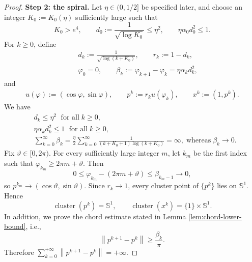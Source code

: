 \documentclass[11pt]{article}
\numberwithin{equation}{section}
\newcommand{\norm}[1]{\left\lVert #1\right\rVert}
\newcommand{\Sone}{\mathbb S^1}
\newcommand{\nn}{\nonumber}
\begin{document}
\begin{proof}
\medskip\noindent
\textbf{Step 2: the spiral.}
Let $\eta\in(0,1/2]$ be specified later, and choose an integer
$K_0:=K_0(\eta)$ sufficiently large such that
\begin{equation}\label{eq:K0-conditions}
K_0>e^4,\qquad
d_0:=\frac{1}{\sqrt{\log K_0}}\leq\eta^2,
\qquad
\eta\alpha_0d_0^2\leq1.
\end{equation}
For $k\geq0$, define
\begin{eqnarray}\label{dkvark}
&&d_k:=\frac1{\sqrt{\log(k+K_0)}},\qquad r_k:=1-d_k,\nn\\
&&\varphi_0=0,\qquad \beta_k:=\varphi_{k+1}-\varphi_k=\eta\alpha_kd_k^2,\end{eqnarray}
and
\begin{eqnarray}\label{uk}
u(\varphi):=(\cos\varphi,\sin\varphi),\qquad p^k:=r_ku(\varphi_k),\qquad x^k:=(1,p^k).
\end{eqnarray}
We have
\begin{align}
 &d_k\le\eta^2\;\mbox{ for all}\; k\ge0,\label{adddk}\\
&\eta\alpha_kd_k^2\le 1\;\mbox{ for all}\; k\ge 0,\nn\\
 &\sum_{k=0}^\infty\beta_k=\frac\eta2\sum_{k=0}^\infty\frac1{(k+K_0+1)\log(k+K_0)}=\infty,
\;
\mbox{whereas}\; \beta_k\to0.
\end{align}
 Fix \(\vartheta\in[0,2\pi)\).  For every sufficiently large integer \(m\),
let \(k_m\) be the first index such that
\(\varphi_{k_m}\geq2\pi m+\vartheta\).  Then
\[
    0\leq\varphi_{k_m}-(2\pi m+\vartheta)
    \leq\beta_{k_m-1}\longrightarrow0,
\]
so \(p^{k_m}\to(\cos\vartheta,\sin\vartheta)\).  Since \(r_k\to1\), every
cluster point of \(\{p^k\}\) lies on \(\Sone\).  Hence
\[
    \operatorname{cluster}(p^k)=\Sone,
    \qquad
    \operatorname{cluster}(x^k)=\{1\}\times\Sone.
\]
 In addition, we prove the chord estimate stated in Lemma \ref{lem:chord-lower-bound}, i.e.,
\begin{equation}\label{eq:chord}
\norm{p^{k+1}-p^k}\ge\frac{\beta_k}{\pi}.
\end{equation}
Therefore $\sum_{k=0}^{+\infty}\norm{p^{k+1}-p^k}=+\infty$.


\end{proof}
\end{document}
